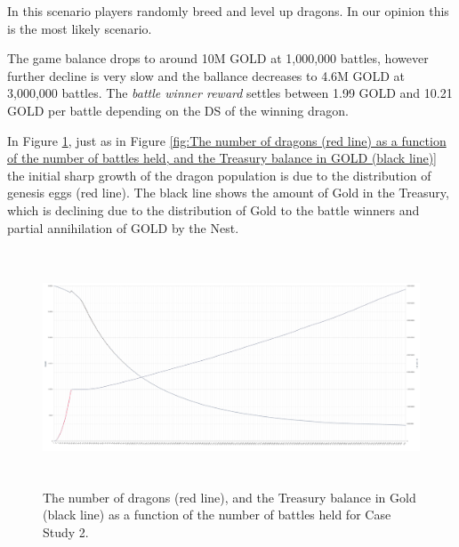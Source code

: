 \documentclass[12pt]{article}
\begin{document}
{\begin{table}[H]
 \end{table}




In this scenario players randomly breed and level up dragons. In our opinion this is the most likely scenario.\par

The game balance drops to around 10M GOLD at 1,000,000 battles, however further decline is very slow and the ballance decreases to 4.6M GOLD at 3,000,000 battles. The \textit{battle winner reward} settles between 1.99 GOLD and 10.21 GOLD per battle depending on the DS of the winning dragon.\par

In Figure \ref{fig:CS2The number of dragons (red line) as a function of the number of battles held, and the Treasury balance in Gold (black line).}, just as in Figure \ref{fig:The number of dragons (red line) as a function of the number of battles held, and the Treasury balance in GOLD (black line)} the initial sharp growth of the dragon population is due to the distribution of genesis eggs (red line). The black line shows the amount of Gold in the Treasury, which is declining due to the distribution of Gold to the battle winners and partial annihilation of GOLD by the Nest.\par




\begin{figure}[H]
	\begin{Center}
		\includegraphics[width=6.27in,height=2.76in]{./media/CS2image1.png}
		\caption{The number of dragons (red line), and the Treasury balance in Gold (black line) as a function of the number of battles held for Case Study 2.}
		\label{fig:CS2The number of dragons (red line) as a function of the number of battles held, and the Treasury balance in Gold (black line).}
	\end{Center}
\end{figure}


}
\end{document}
